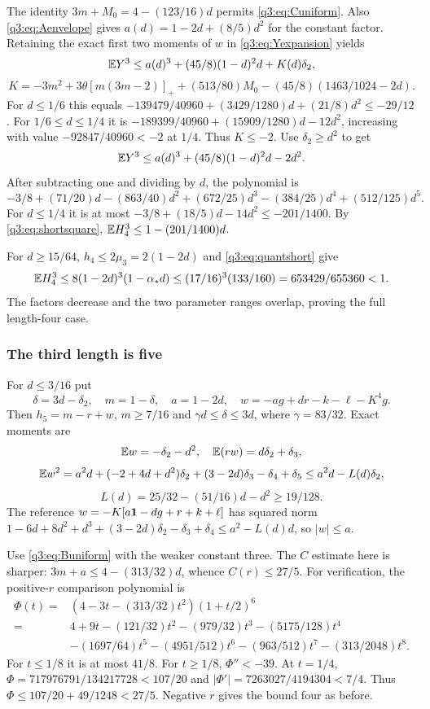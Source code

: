 The identity $3m+M_0=4-(123/16)d$ permits \eqref{q3:eq:Cuniform}. Also \eqref{q3:eq:Aenvelope} gives $a(d)=1-2d+(8/5)d^2$ for the constant factor. Retaining the exact first two moments of $w$ in \eqref{q3:eq:Yexpansion} yields
\[
 \mathbb E Y^3\le a(d)^3+(45/8)(1-d)^2d+K(d)\delta_{2},
\]
\[
 K=-3m^2+3\theta[m(3m-2)]_+
 +(513/80)M_0-(45/8)(1463/1024-2d).
\]
For $d\le1/6$ this equals
$-139479/40960+(3429/1280)d+(21/8)d^2\le-29/12$.
For $1/6\le d\le1/4$ it is
$-189399/40960+(15909/1280)d-12d^2$, increasing with value
$-92847/40960<-2$ at $1/4$. Thus $K\le-2$. Use $\delta_{2}\ge d^2$ to get
\[
 \mathbb E Y^3\le a(d)^3+(45/8)(1-d)^2d-2d^2.
\]
After subtracting one and dividing by $d$, the polynomial is
\[
 -3/8+(71/20)d-(863/40)d^2+(672/25)d^3
 -(384/25)d^4+(512/125)d^5.
\]
For $d\le1/4$ it is at most $-3/8+(18/5)d-14d^2\le-201/1400$.
By \eqref{q3:eq:shortsquare}, $\mathbb E H_4^3\le1-(201/1400)d$.

For $d\ge15/64$, $h_4\le2\mu_3=2(1-2d)$ and \eqref{q3:eq:quantshort} give
\[
 \mathbb E H_4^3\le8(1-2d)^3(1-\alpha_*d)
 \le(17/16)^3(133/160)=653429/655360<1.
\]
The factors decrease and the two parameter ranges overlap, proving the full length-four case.

\subsubsection{The third length is five}
For $d\le3/16$ put
\[
 \delta=3d-\delta_{2},\quad m=1-\delta,\quad a=1-2d,\quad
 w=-ag+dr-k-\ell-K^4g .
\]
Then $h_5=m-r+w$, $m\ge7/16$ and $\gamma d\le\delta\le3d$, where $\gamma=83/32$. Exact moments are
\[
 \mathbb E w=-\delta_{2}-d^2,\quad \mathbb E(rw)=d\delta_{2}+\delta_{3},
\]
\[
 \mathbb E w^2=a^2d+(-2+4d+d^2)\delta_{2}+(3-2d)\delta_{3}-\delta_{4}+\delta_{5}
 \le a^2d-L(d)\delta_{2},
\]
\[
 L(d)=25/32-(51/16)d-d^2\ge19/128.
\]
The reference $w=-K[a\mathbf1-dg+r+k+\ell]$ has squared norm
$1-6d+8d^2+d^3+(3-2d)\delta_{2}-\delta_{3}+\delta_{4}\le a^2-L(d)d$, so $|w|\le a$.

Use \eqref{q3:eq:Buniform} with the weaker constant three. The $C$ estimate here is sharper:
$3m+a\le4-(313/32)d$, whence $C(r)\le27/5$.
For verification, the positive-$r$ comparison polynomial is
\[
\begin{split}
 \Phi(t)={}&(4-3t-(313/32)t^2)(1+t/2)^6\\
 ={}&4+9t-(121/32)t^2-(979/32)t^3-(5175/128)t^4\\
 &-(1697/64)t^5-(4951/512)t^6-(963/512)t^7-(313/2048)t^8 .
\end{split}
\]
For $t\le1/8$ it is at most $41/8$. For $t\ge1/8$, $\Phi''<-39$.
At $t=1/4$, $\Phi=717976791/134217728<107/20$ and $|\Phi'|=7263027/4194304<7/4$. Thus $\Phi\le107/20+49/1248<27/5$. Negative $r$ gives the bound four as before.

